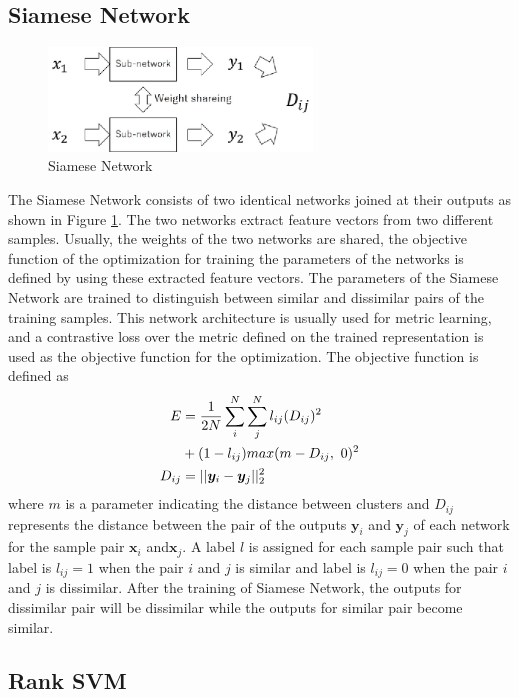 \documentclass[twocolumn,10pt]{article}
\begin{document}
\subsection{Siamese Network}
\begin{figure}[ht]
\begin{center}
\includegraphics[width=70mm]{figure1.eps}
\caption{Siamese Network}
\label{fig:siamese}
\end{center}
\end{figure}

The Siamese Network \cite{Bromely1993,Chopra2005,Hadsell2006} consists of two identical networks joined at their outputs as shown in Figure \ref{fig:siamese}.
The two networks extract feature vectors from two different samples.
Usually, the weights of the two networks are shared, the objective function of the optimization for training the parameters of the networks is defined by using these extracted feature vectors.
The parameters of the Siamese Network are trained to distinguish between similar and dissimilar pairs of the training samples. 
This network architecture is usually used for metric learning, and a contrastive loss over the metric defined on the trained representation is used as the objective function for the optimization. The objective function is defined as
\begin{align} \label{eq:contrastive}
E&=\frac{1}{2N}\sum_i^N \sum_j^N l_{ij}(D_{ij})^2 \notag \\
&+ (1-l_{ij})max(m-D_{ij}, ~0)^2 \\
D_{ij}&=||{\bm y}_{i}-{\bm y}_{j}||^2_2
\label{eq:dis}
\end{align}
where $m$ is a parameter indicating the distance between clusters and 
$D_{ij}$ represents the distance between the pair of the outputs $\bm{y}_i$ and $\bm{y}_j$ of each network for the sample pair $\bm{x}_i$ and$\bm{x}_j$.
A label $l$ is assigned for each sample pair such that 
label is $l_{ij}=1$ when the pair $i$ and $j$ is similar and label is $l_{ij}=0$ when the pair $i$ and $j$ is dissimilar.
After the training of Siamese Network, the outputs for dissimilar pair will be dissimilar while the outputs for similar pair become similar.


\subsection{Rank SVM}
\end{document}
